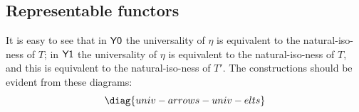 \documentclass[oneside,12pt]{article}
\begin{document}
%
\subsection{Representable functors \DONE}
\label{representable-functors}

It is easy to see that in $\mathsf{Y0}$ the universality of $η$ is
equivalent to the natural-iso-ness of $T$; in $\mathsf{Y1}$ the universality
of $η$ is equivalent to the natural-iso-ness of $T$, and this is
equivalent to the natural-iso-ness of $T'$. The constructions should
be evident from these diagrams:
%
%
$$\pu
  \diag{univ-arrows-univ-elts}
$$
\end{document}
